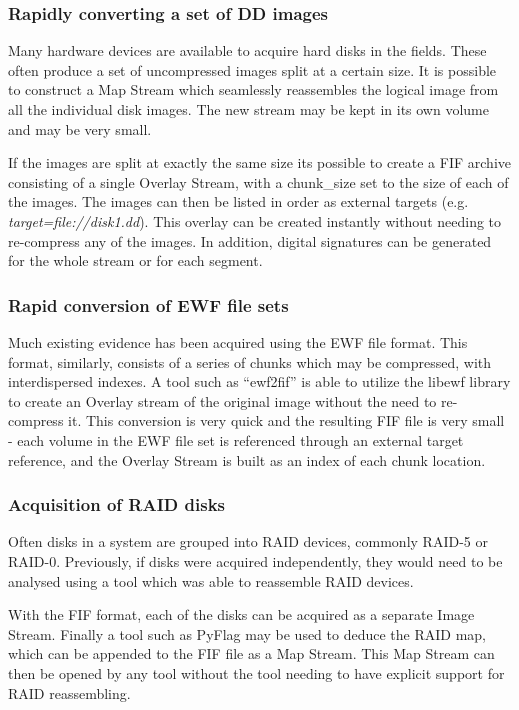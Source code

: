 \documentclass[10pt, conference]{IEEEtran}
\begin{document}
\subsubsection{Rapidly converting a set of DD images}
Many hardware devices are available to acquire hard disks in the
fields. These often produce a set of uncompressed images split at a
certain size. It is possible to construct a Map Stream which
seamlessly reassembles the logical image from all the individual disk
images. The new stream may be kept in its own volume and may be very
small. 

If the images are split at exactly the same size its
possible to create a FIF archive consisting of a single Overlay
Stream, with a chunk\_size set to the size of each of the images. The
images can then be listed in order as external targets (e.g. {\em
target=file://disk1.dd}). This overlay can be created instantly
without needing to re-compress any of the images. In addition, digital
signatures can be generated for the whole stream or for each segment.

\subsubsection{Rapid conversion of EWF file sets}
Much existing evidence has been acquired using the EWF file
format. This format, similarly, consists of a series of chunks which
may be compressed, with interdispersed indexes. A tool such as
``ewf2fif'' is able to utilize the libewf library to create an Overlay
stream of the original image without the need to re-compress it. This
conversion is very quick and the resulting FIF file is very small -
each volume in the EWF file set is referenced through an external
target reference, and the Overlay Stream is built as an index of each
chunk location.

\subsubsection{Acquisition of RAID disks}
Often disks in a system are grouped into RAID devices, commonly RAID-5
or RAID-0. Previously, if disks were acquired independently, they
would need to be analysed using a tool which was able to reassemble
RAID devices.

With the FIF format, each of the disks can be acquired as a separate
Image Stream. Finally a tool such as PyFlag may be used to deduce the
RAID map, which can be appended to the FIF file as a Map Stream. This
Map Stream can then be opened by any tool without the tool needing to
have explicit support for RAID reassembling.
\end{document}
